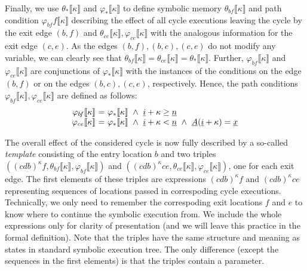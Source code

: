 \documentclass{sig-alternate}%
\newcommand{\sym}[1]{\ensuremath{\underline{#1}}}
\newcommand{\prm}[1]{\ensuremath{\llbracket #1 \rrbracket}}
\begin{document}
Finally, we use $\theta_*\prm{\kappa}$ and $\varphi_*\prm{\kappa}$ to define
symbolic memory $\theta_{b\!f}\prm{\kappa}$ and path condition
$\varphi_{b\!f}f\prm{\kappa}$ describing the effect of all cycle executions
leaving the cycle by the exit edge $(b,f)$ and
$\theta_{ce}\prm{\kappa},\varphi_{ce}\prm{\kappa}$ with the analogous
information for the exit edge $(c,e)$. As the edges $(b,f),(b,c),(c,e)$ do not
modify any variable, we can clearly see that
$\theta_{b\!f}\prm{\kappa}=\theta_{ce}\prm{\kappa}=\theta_*\prm{\kappa}$.
Further, $\varphi_{b\!f}\prm{\kappa}$ and $\varphi_{ce}\prm{\kappa}$ are
conjunctions of $\varphi_*\prm{\kappa}$ with the instances of the conditions
on the edge $(b,f)$ or on the edges $(b,c),(c,e)$, respectively. Hence, the
path conditions $\varphi_{b\!f}\prm{\kappa},\varphi_{ce}\prm{\kappa}$ are
defined as follows:
\[
\setlength{\arraycolsep}{0pt}
\begin{array}{rcl}
  \varphi_{b\!f}\prm{\kappa}&~=~&\varphi_*\prm{\kappa}~\wedge~\sym{i}+\kappa\ge\sym{n}\\
  \varphi_{ce}\prm{\kappa}&=&\varphi_*\prm{\kappa}~\wedge~\sym{i}+\kappa<\sym{n}
    ~\wedge~\sym{A}(\sym{i}+\kappa)=\sym{x}
\end{array}
\]

The overall effect of the considered cycle is now fully described by a
so-called \emph{template} consisting of the entry location $b$ and two
triples $((cdb)^\kappa
f,\theta_{b\!f}\prm{\kappa},\varphi_{b\!f}\prm{\kappa})$ and $((cdb)^\kappa
ce,\theta_{ce}\prm{\kappa},\varphi_{ce}\prm{\kappa})$, one for each exit
edge. The first elements of these triples are expressions $(cdb)^\kappa f$
and $(cdb)^\kappa ce$ representing sequences of locations passed in
correspoding cycle executions. Technically, we only need to remember the
correspoding exit locations $f$ and $e$ to know where to continue the
symbolic execution from. We include the whole expressions only for clarity
of presentation (and we will leave this practice in the formal definition).
Note that the triples have the same structure and meaning as states in
standard symbolic execution tree. The only difference (except the sequences
in the first elements) is that the triples contain a parameter. 
\end{document}
